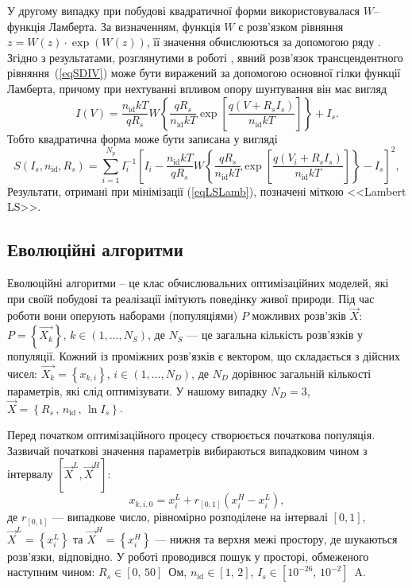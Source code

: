 У другому випадку при побудові квадратичної форми використовувалася $W$--функція Ламберта.
За визначенням, функція $W$ є розв'язком рівняння $z=W(z)\cdot\exp(W(z))$, її значення обчислюються за допомогою ряду \cite{LambertBook}.
Згідно з результатами, розглянутими в роботі \cite{Lambert_Jung}, явний розв'язок  трансцендентного рівняння~(\ref{eqSDIV}) може бути виражений за допомогою основної гілки функції Ламберта, причому при нехтуванні впливом опору шунтування він має вигляд
\begin{equation}
\label{eqLam}
    I(V)=\frac{n_\mathrm{id}kT}{qR_s}W\left\{\frac{qR_s}{n_\mathrm{id}kT}
      \exp\left[\frac{q(V+R_sI_s)}{n_\mathrm{id}kT}\right]  \right\}+I_s.
\end{equation}
Тобто квадратична форма може бути записана у вигляді
\begin{equation}
\label{eqLSLamb}
S(I_s,n_\mathrm{id},R_s)=\sum_{i=1}^{N_p}I_i^{-1}\left[I_i-\frac{n_\mathrm{id}kT}{qR_s}W\left\{\frac{qR_s}{n_\mathrm{id}kT}
      \exp\left[\frac{q(V_i+R_sI_s)}{n_\mathrm{id}kT}\right]  \right\}-I_s\right]^2,
\end{equation}
Результати, отримані при мінімізації (\ref{eqLSLamb}), позначені міткою <<Lambert LS>>.


\subsection{Еволюційні алгоритми\label{subEA}}
Еволюційні алгоритми -- це клас обчислювальних оптимізаційних моделей, які при своїй побудові та реалізації імітують поведінку живої природи.
Під час роботи вони оперують наборами (популяціями) $P$ можливих розв'зків
$\overrightarrow{X}$: $P=\left\{\overrightarrow{X_k}\right\}$, $k\in(1,\ldots, N_S)$,
де $N_S$ --- це загальна кількість розв'язків у популяції.
Кожний із проміжних розв'язків є вектором, що складається з дійсних чисел:
$\overrightarrow{X_k}=\left\{x_{k,i}\right\}$, $i\in(1,\ldots, N_D)$,
де
$N_D$ дорівнює загальній кількості параметрів, які слід оптимізувати.
У нашому випадку $N_D=3$, $\overrightarrow{X}=\left\{R_s\,,\,n_\mathrm{id}\,,\,\ln I_s\right\}$.

Перед початком оптимізаційного процесу створюється початкова популяція.
Зазвичай початкові значення параметрів вибираються випадковим чином з інтервалу
$[\overrightarrow{X}^{L}, \overrightarrow{X}^{H}]$:
\begin{equation}
\label{eqEAIn}
x_{k,i,0}=x_i^L+r_{[0,1]}(x_i^H-x_i^L),
\end{equation}
де
$r_{[0,1]}$ --- випадкове число, рівномірно розподілене на інтервалі $[0,1]$,
$\overrightarrow{X}^{L}=\left\{x_i^L\right\}$ та $\overrightarrow{X}^{H}=\left\{x_i^H\right\}$ ---
нижня та верхня межі простору, де шукаються розв'язки, відповідно.
У роботі проводився пошук у просторі, обмеженого наступним чином:
$R_s\in[0,\,50]$~Ом, $n_\mathrm{id}\in[1,\,2]$, $I_s\in[10^{-26},\,10^{-2}]$~A.

